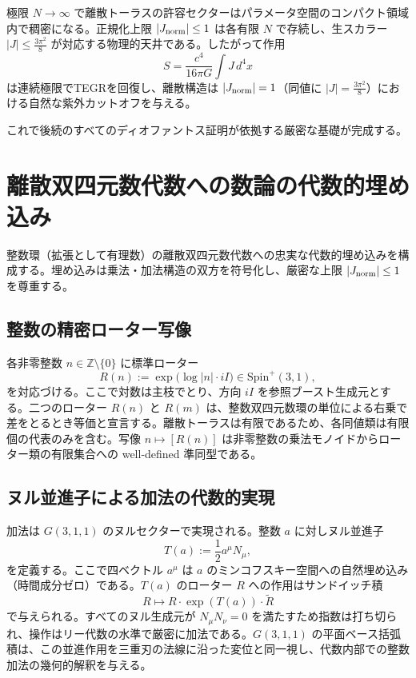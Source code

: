 \documentclass[dvipdfmx,a4paper]{article}
\theoremstyle{definition}
\theoremstyle{remark}
\newcommand{\Jnorm}{J_{\rm norm}}
\newcommand{\Jbound}{\frac{3\pi^2}{8}}
\begin{document}
極限 $N \to \infty$ で離散トーラスの許容セクターはパラメータ空間のコンパクト領域内で稠密になる。正規化上限 $|\Jnorm| \leq 1$ は各有限 $N$ で存続し、生スカラー $|J| \leq \Jbound$ が対応する物理的天井である。したがって作用
\[
S = \frac{c^4}{16\pi G} \int J \, d^4x
\]
は連続極限でTEGRを回復し、離散構造は $|\Jnorm| = 1$（同値に $|J| = \Jbound$）における自然な紫外カットオフを与える。

これで後続のすべてのディオファントス証明が依拠する厳密な基礎が完成する。

\section{離散双四元数代数への数論の代数的埋め込み}

整数環（拡張として有理数）の離散双四元数代数への忠実な代数的埋め込みを構成する。埋め込みは乗法・加法構造の双方を符号化し、厳密な上限 $|\Jnorm| \leq 1$ を尊重する。

\subsection{整数の精密ローター写像}

各非零整数 $n \in \mathbb{Z} \setminus \{0\}$ に標準ローター
\[
R(n) := \exp\bigl( \log |n| \cdot iI \bigr) \in \mathrm{Spin}^+(3,1),
\]
を対応づける。ここで対数は主枝でとり、方向 $iI$ を参照ブースト生成元とする。二つのローター $R(n)$ と $R(m)$ は、整数双四元数環の単位による右乗で差をとるとき等価と宣言する。離散トーラスは有限であるため、各同値類は有限個の代表のみを含む。写像 $n \mapsto [R(n)]$ は非零整数の乗法モノイドからローター類の有限集合への well-defined 準同型である。

\subsection{ヌル並進子による加法の代数的実現}

加法は $G(3,1,1)$ のヌルセクターで実現される。整数 $a$ に対しヌル並進子
\[
T(a) := \frac12 a^\mu N_\mu,
\]
を定義する。ここで四ベクトル $a^\mu$ は $a$ のミンコフスキー空間への自然埋め込み（時間成分ゼロ）である。$T(a)$ のローター $R$ への作用はサンドイッチ積
\[
R \mapsto R \cdot \exp(T(a)) \cdot \widetilde{R}
\]
で与えられる。すべてのヌル生成元が $N_\mu N_\nu = 0$ を満たすため指数は打ち切られ、操作はリー代数の水準で厳密に加法である。$G(3,1,1)$ の平面ベース括弧積は、この並進作用を三重刃の法線に沿った変位と同一視し、代数内部での整数加法の幾何的解釈を与える。
\end{document}
